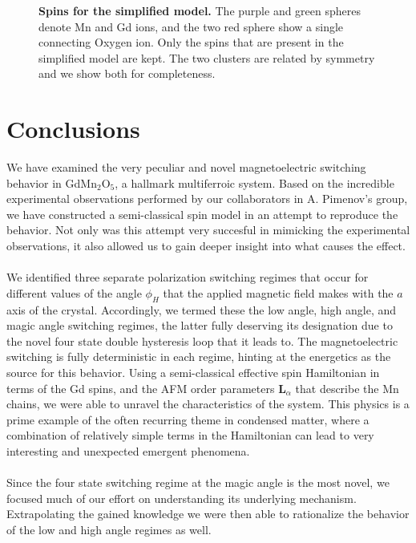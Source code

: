 \begin{figure}[b]
	\caption{\label{fig:GdMn2O5_simple_model}{\bf Spins for the simplified model.} The purple and green spheres denote Mn and Gd ions, and the two red sphere show a single connecting Oxygen ion. Only the spins that are present in the simplified model are kept. The two clusters are related by symmetry and we show both for completeness.}
\end{figure}

\section{Conclusions}
We have examined the very peculiar and novel magnetoelectric switching behavior in GdMn$_2$O$_5$, a hallmark multiferroic system.
Based on the incredible experimental observations performed by our collaborators in A. Pimenov's group, we have constructed a semi-classical spin model in an attempt to reproduce the behavior.
Not only was this attempt very succesful in mimicking the experimental observations, it also allowed us to gain deeper insight into what causes the effect.
\\\\
We identified three separate polarization switching regimes that occur for different values of the angle $\phi_H$ that the applied magnetic field makes with the $a$ axis of the crystal.
Accordingly, we termed these the low angle, high angle, and magic angle switching regimes, the latter fully deserving its designation due to the novel four state double hysteresis loop that it leads to.
The magnetoelectric switching is fully deterministic in each regime, hinting at the energetics as the source for this behavior.
Using a semi-classical effective spin Hamiltonian in terms of the Gd spins, and the AFM order parameters $\bm L_\alpha$ that describe the Mn chains, we were able to unravel the characteristics of the system.
This physics is a prime example of the often recurring theme in condensed matter, where a combination of relatively simple terms in the Hamiltonian can lead to very interesting and unexpected emergent phenomena.
\\\\
Since the four state switching regime at the magic angle is the most novel, we focused much of our effort on understanding its underlying mechanism. Extrapolating the gained knowledge we were then able to rationalize the behavior of the low and high angle regimes as well.

